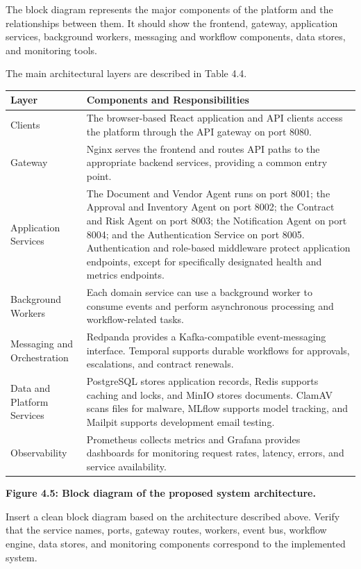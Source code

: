 \documentclass[12pt,a4paper]{report}
\begin{document}
The block diagram represents the major components of the platform
and the relationships between them. It should show the frontend,
gateway, application services, background workers, messaging and
workflow components, data stores, and monitoring tools.

The main architectural layers are described in Table 4.4.

\begin{longtable}{|p{1.4in}|p{4.3in}|}
\hline
\textbf{Layer} & \textbf{Components and Responsibilities} \\
\hline
Clients & The browser-based React application and API clients access the platform through the API gateway on port 8080. \\
\hline
Gateway & Nginx serves the frontend and routes API paths to the appropriate backend services, providing a common entry point. \\
\hline
Application Services & The Document and Vendor Agent runs on port 8001; the Approval and Inventory Agent on port 8002; the Contract and Risk Agent on port 8003; the Notification Agent on port 8004; and the Authentication Service on port 8005. Authentication and role-based middleware protect application endpoints, except for specifically designated health and metrics endpoints. \\
\hline
Background Workers & Each domain service can use a background worker to consume events and perform asynchronous processing and workflow-related tasks. \\
\hline
Messaging and Orchestration & Redpanda provides a Kafka-compatible event-messaging interface. Temporal supports durable workflows for approvals, escalations, and contract renewals. \\
\hline
Data and Platform Services & PostgreSQL stores application records, Redis supports caching and locks, and MinIO stores documents. ClamAV scans files for malware, MLflow supports model tracking, and Mailpit supports development email testing. \\
\hline
Observability & Prometheus collects metrics and Grafana provides dashboards for monitoring request rates, latency, errors, and service availability. \\
\hline
\end{longtable}

\textbf{Figure 4.5: Block diagram of the proposed system architecture.}

Insert a clean block diagram based on the architecture described
above. Verify that the service names, ports, gateway routes,
workers, event bus, workflow engine, data stores, and monitoring
components correspond to the implemented system.
\end{document}
